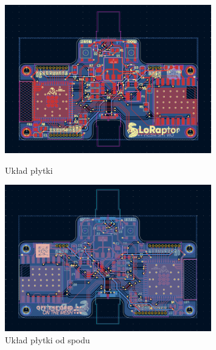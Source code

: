 \clearpage
\begin{figure}[htbp]
\centering
	\includegraphics[width=0.8\textwidth]{root/pcb_layout.png}
	\caption{Układ płytki}
	\vspace{1cm}
	\includegraphics[width=0.8\textwidth]{root/pcb_layout_bottom.png}
	\caption{Układ płytki od spodu}
\end{figure}

\clearpage

